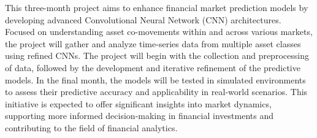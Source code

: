 \thesisspacing %

This three-month project aims to enhance financial market prediction models by developing advanced Convolutional Neural Network (CNN) architectures. Focused on understanding asset co-movements within and across various markets, the project will gather and analyze time-series data from multiple asset classes using refined CNNs. The project will begin with the collection and preprocessing of data, followed by the development and iterative refinement of the predictive models. In the final month, the models will be tested in simulated environments to assess their predictive accuracy and applicability in real-world scenarios. This initiative is expected to offer significant insights into market dynamics, supporting more informed decision-making in financial investments and contributing to the field of financial analytics.

